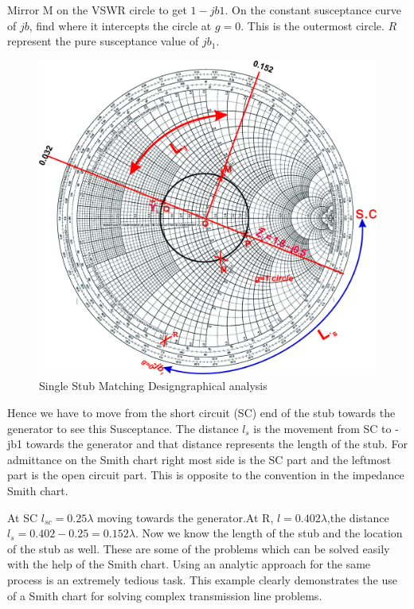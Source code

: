 \begin{exmp}
Mirror M on the VSWR circle to get $1-jb1$. On the constant susceptance curve of $jb$, find where it intercepts the circle at $g=0$. This is the outermost circle. $R$ represent the pure susceptance value of $jb_1$. 
\begin{figure}[h]
\centering
\includegraphics[width=1\linewidth]{./graphics/fig14}
\caption{Single Stub Matching Design\textemdash\;graphical analysis}
\label{fig:fig14}
\end{figure}

Hence we have to move from the short circuit (SC) end of the stub towards the generator to see this Susceptance. The distance $l_s$ is the movement from SC to -jb1 towards the generator and that distance represents the length of the stub. For admittance on the Smith chart right most side is the SC part and the leftmost part is the open circuit part. This is opposite to the convention in the impedance Smith chart.

At SC $l_{sc}=0.25\lambda$ moving towards the generator.At R, $l=0.402\lambda$,the distance $l_s=0.402-0.25=0.152\lambda$. Now we know the length of the stub and the location of the stub as well. These are some of the problems which can be solved easily with the help of the Smith chart. Using an analytic approach for the same process is an extremely tedious task. This example clearly demonstrates the use of a Smith chart for solving complex transmission line problems.
\end{exmp}

